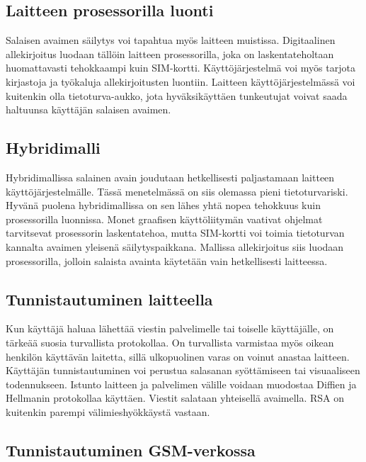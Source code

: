 \documentclass[finnish]{tktltiki2}
\theoremstyle{definition}
\theoremstyle{remark}
\begin{document}
\subsection{Laitteen prosessorilla luonti}

Salaisen avaimen säilytys voi tapahtua myös laitteen muistissa. Digitaalinen allekirjoitus luodaan tällöin laitteen prosessorilla, joka on laskentateholtaan huomattavasti tehokkaampi kuin SIM-kortti. Käyttöjärjestelmä voi myös tarjota kirjastoja ja työkaluja allekirjoitusten luontiin. Laitteen käyttöjärjestelmässä voi kuitenkin olla tietoturva-aukko, jota hyväksikäyttäen tunkeutujat voivat saada haltuunsa käyttäjän salaisen avaimen.

\subsection{Hybridimalli}

Hybridimallissa salainen avain joudutaan hetkellisesti paljastamaan laitteen käyttöjärjestelmälle. Tässä menetelmässä on siis olemassa pieni tietoturvariski. Hyvänä puolena hybridimallissa on sen lähes yhtä nopea tehokkuus kuin prosessorilla luonnissa. Monet graafisen käyttöliitymän vaativat ohjelmat tarvitsevat prosessorin laskentatehoa, mutta SIM-kortti voi toimia tietoturvan kannalta avaimen yleisenä säilytyspaikkana. Mallissa allekirjoitus siis luodaan prosessorilla, jolloin salaista avainta käytetään vain hetkellisesti laitteessa.


\subsection{Tunnistautuminen laitteella}
Kun käyttäjä haluaa lähettää viestin palvelimelle tai toiselle käyttäjälle, on tärkeää suosia turvallista protokollaa. On turvallista varmistaa myös oikean henkilön käyttävän laitetta, sillä ulkopuolinen varas on voinut anastaa laitteen. Käyttäjän tunnistautuminen voi perustua salasanan syöttämiseen tai visuaaliseen todennukseen. Istunto laitteen ja palvelimen välille voidaan muodostaa Diffien ja Hellmanin protokollaa käyttäen. Viestit salataan yhteisellä avaimella. RSA on kuitenkin parempi välimieshyökkäystä vastaan. 

\subsection{Tunnistautuminen GSM-verkossa}
\end{document}
